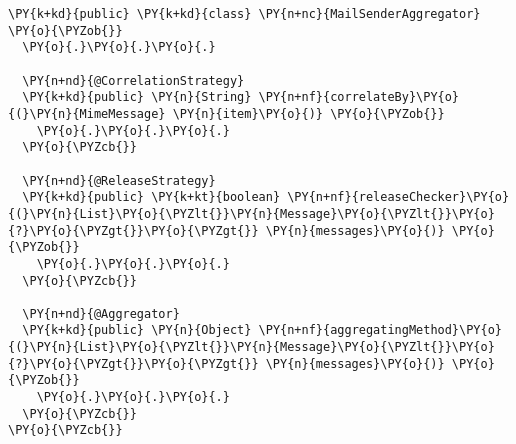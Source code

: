 \begin{Verbatim}[commandchars=\\\{\}]
\PY{k+kd}{public} \PY{k+kd}{class} \PY{n+nc}{MailSenderAggregator} \PY{o}{\PYZob{}}
  \PY{o}{.}\PY{o}{.}\PY{o}{.}

  \PY{n+nd}{@CorrelationStrategy}
  \PY{k+kd}{public} \PY{n}{String} \PY{n+nf}{correlateBy}\PY{o}{(}\PY{n}{MimeMessage} \PY{n}{item}\PY{o}{)} \PY{o}{\PYZob{}}
    \PY{o}{.}\PY{o}{.}\PY{o}{.}
  \PY{o}{\PYZcb{}}

  \PY{n+nd}{@ReleaseStrategy}
  \PY{k+kd}{public} \PY{k+kt}{boolean} \PY{n+nf}{releaseChecker}\PY{o}{(}\PY{n}{List}\PY{o}{\PYZlt{}}\PY{n}{Message}\PY{o}{\PYZlt{}}\PY{o}{?}\PY{o}{\PYZgt{}}\PY{o}{\PYZgt{}} \PY{n}{messages}\PY{o}{)} \PY{o}{\PYZob{}}
    \PY{o}{.}\PY{o}{.}\PY{o}{.}
  \PY{o}{\PYZcb{}}

  \PY{n+nd}{@Aggregator}
  \PY{k+kd}{public} \PY{n}{Object} \PY{n+nf}{aggregatingMethod}\PY{o}{(}\PY{n}{List}\PY{o}{\PYZlt{}}\PY{n}{Message}\PY{o}{\PYZlt{}}\PY{o}{?}\PY{o}{\PYZgt{}}\PY{o}{\PYZgt{}} \PY{n}{messages}\PY{o}{)} \PY{o}{\PYZob{}}
    \PY{o}{.}\PY{o}{.}\PY{o}{.}
  \PY{o}{\PYZcb{}}
\PY{o}{\PYZcb{}}
\end{Verbatim}
